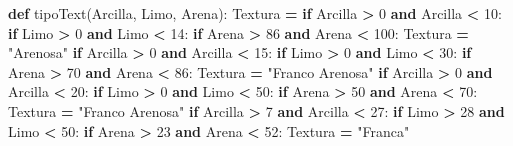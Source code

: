 \documentclass[
]{article}
\newenvironment{Shaded}{\begin{snugshade}}{\end{snugshade}}
\newcommand{\ControlFlowTok}[1]{\textcolor[rgb]{0.13,0.29,0.53}{\textbf{#1}}}
\newcommand{\DecValTok}[1]{\textcolor[rgb]{0.00,0.00,0.81}{#1}}
\newcommand{\KeywordTok}[1]{\textcolor[rgb]{0.13,0.29,0.53}{\textbf{#1}}}
\newcommand{\NormalTok}[1]{#1}
\newcommand{\OperatorTok}[1]{\textcolor[rgb]{0.81,0.36,0.00}{\textbf{#1}}}
\newcommand{\StringTok}[1]{\textcolor[rgb]{0.31,0.60,0.02}{#1}}
\begin{document}
\begin{Shaded}
\begin{Highlighting}[]
\KeywordTok{def}\NormalTok{ tipoText(Arcilla, Limo, Arena):}
\NormalTok{  Textura }\OperatorTok{=} \StringTok{\textquotesingle{}\textquotesingle{}}
  \ControlFlowTok{if}\NormalTok{ Arcilla }\OperatorTok{\textgreater{}} \DecValTok{0} \KeywordTok{and}\NormalTok{ Arcilla }\OperatorTok{\textless{}} \DecValTok{10}\NormalTok{:}
    \ControlFlowTok{if}\NormalTok{ Limo }\OperatorTok{\textgreater{}} \DecValTok{0} \KeywordTok{and}\NormalTok{ Limo }\OperatorTok{\textless{}} \DecValTok{14}\NormalTok{:}
      \ControlFlowTok{if}\NormalTok{ Arena }\OperatorTok{\textgreater{}} \DecValTok{86} \KeywordTok{and}\NormalTok{ Arena }\OperatorTok{\textless{}} \DecValTok{100}\NormalTok{:}
\NormalTok{        Textura }\OperatorTok{=} \StringTok{"Arenosa"}
  \ControlFlowTok{if}\NormalTok{ Arcilla }\OperatorTok{\textgreater{}} \DecValTok{0} \KeywordTok{and}\NormalTok{ Arcilla }\OperatorTok{\textless{}} \DecValTok{15}\NormalTok{:}
    \ControlFlowTok{if}\NormalTok{ Limo }\OperatorTok{\textgreater{}} \DecValTok{0} \KeywordTok{and}\NormalTok{ Limo }\OperatorTok{\textless{}} \DecValTok{30}\NormalTok{:}
      \ControlFlowTok{if}\NormalTok{ Arena }\OperatorTok{\textgreater{}} \DecValTok{70} \KeywordTok{and}\NormalTok{ Arena }\OperatorTok{\textless{}} \DecValTok{86}\NormalTok{:}
\NormalTok{        Textura }\OperatorTok{=} \StringTok{"Franco Arenosa"}
  \ControlFlowTok{if}\NormalTok{ Arcilla }\OperatorTok{\textgreater{}} \DecValTok{0} \KeywordTok{and}\NormalTok{ Arcilla }\OperatorTok{\textless{}} \DecValTok{20}\NormalTok{:}
    \ControlFlowTok{if}\NormalTok{ Limo }\OperatorTok{\textgreater{}} \DecValTok{0} \KeywordTok{and}\NormalTok{ Limo }\OperatorTok{\textless{}} \DecValTok{50}\NormalTok{:}
      \ControlFlowTok{if}\NormalTok{ Arena }\OperatorTok{\textgreater{}} \DecValTok{50} \KeywordTok{and}\NormalTok{ Arena }\OperatorTok{\textless{}} \DecValTok{70}\NormalTok{:}
\NormalTok{        Textura }\OperatorTok{=} \StringTok{"Franco Arenosa"}
  \ControlFlowTok{if}\NormalTok{ Arcilla }\OperatorTok{\textgreater{}} \DecValTok{7} \KeywordTok{and}\NormalTok{ Arcilla }\OperatorTok{\textless{}} \DecValTok{27}\NormalTok{:}
    \ControlFlowTok{if}\NormalTok{ Limo }\OperatorTok{\textgreater{}} \DecValTok{28} \KeywordTok{and}\NormalTok{ Limo }\OperatorTok{\textless{}} \DecValTok{50}\NormalTok{:}
      \ControlFlowTok{if}\NormalTok{ Arena }\OperatorTok{\textgreater{}} \DecValTok{23} \KeywordTok{and}\NormalTok{ Arena }\OperatorTok{\textless{}} \DecValTok{52}\NormalTok{:}
\NormalTok{        Textura }\OperatorTok{=} \StringTok{"Franca"}

\end{Highlighting}
\end{Shaded}
\end{document}
